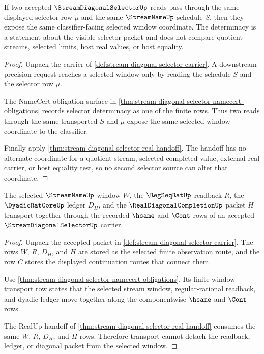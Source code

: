 \begin{theorem}
\label{thm:stream-diagonal-selector-selector-determinacy}
If two accepted $\StreamDiagonalSelectorUp$ reads pass through the same displayed selector row $\mu$ and the same $\StreamNameUp$ schedule $S$, then they expose the same classifier-facing selected window coordinate. The determinacy is a statement about the visible selector packet and does not compare quotient streams, selected limits, host real values, or host equality.
\end{theorem}
\begin{proof}
Unpack the carrier of \autoref{def:stream-diagonal-selector-carrier}. A downstream precision request reaches a selected window only by reading the schedule $S$ and the selector row $\mu$.

The NameCert obligation surface in \autoref{thm:stream-diagonal-selector-namecert-obligations} records selector determinacy as one of the finite rows. Thus two reads through the same transported $S$ and $\mu$ expose the same selected window coordinate to the classifier.

Finally apply \autoref{thm:stream-diagonal-selector-real-handoff}. The handoff has no alternate coordinate for a quotient stream, selected completed value, external real carrier, or host equality test, so no second selector source can alter that coordinate.
\end{proof}

\begin{theorem}
\label{thm:stream-diagonal-selector-window-transport}
The selected $\StreamNameUp$ window $W$, the $\RegSeqRatUp$ readback $R$, the $\DyadicRatCoreUp$ ledger $D_H$, and the $\RealDiagonalCompletionUp$ packet $H$ transport together through the recorded $\hsame$ and $\Cont$ rows of an accepted $\StreamDiagonalSelectorUp$ carrier.
\end{theorem}
\begin{proof}
Unpack the accepted packet in \autoref{def:stream-diagonal-selector-carrier}. The rows $W$, $R$, $D_H$, and $H$ are stored as the selected finite observation route, and the row $C$ stores the displayed continuation routes that connect them.

Use \autoref{thm:stream-diagonal-selector-namecert-obligations}. Its finite-window transport row states that the selected stream window, regular-rational readback, and dyadic ledger move together along the componentwise $\hsame$ and $\Cont$ rows.

The RealUp handoff of \autoref{thm:stream-diagonal-selector-real-handoff} consumes the same $W$, $R$, $D_H$, and $H$ rows. Therefore transport cannot detach the readback, ledger, or diagonal packet from the selected window.
\end{proof}

